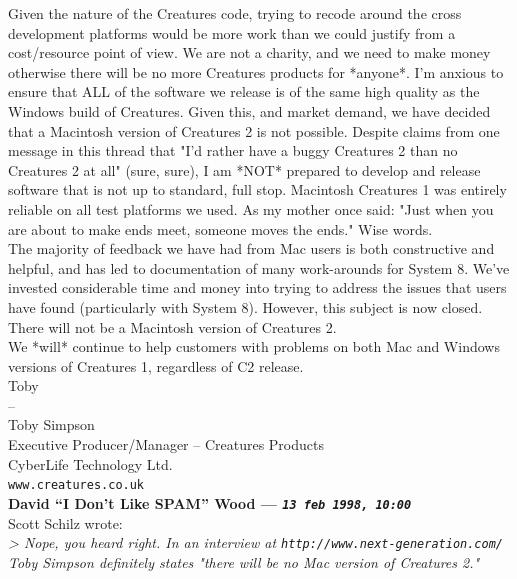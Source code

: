 \documentclass[11pt,twoside,a4paper]{article}
\begin{document}
\begin{multicols*}{2}
Given the nature of the Creatures code, trying to recode around the cross development platforms would be more work than we could justify from a cost/resource point of view. We are not a charity, and we need to make money otherwise there will be no more Creatures products for *anyone*. I'm anxious to ensure that ALL of the software we release is of the same high quality as the Windows build of Creatures. Given this, and market demand, we have decided that a Macintosh version of Creatures 2 is not possible. Despite claims from one message in this thread that "I'd rather have a buggy Creatures 2 than no Creatures 2 at all" (sure, sure), I am *NOT* prepared to develop and release software that is not up to standard, full stop. Macintosh Creatures 1 was entirely reliable on all test platforms we used. As my mother once said: "Just when you are about to make ends meet, someone moves the ends." Wise words. ~\\

The majority of feedback we have had from Mac users is both constructive and helpful, and has led to documentation of many work-arounds for System 8. We've invested considerable time and money into trying to address the issues that users have found (particularly with System 8). However, this subject is now closed. There will not be a Macintosh version of Creatures 2. ~\\

We *will* continue to help customers with problems on both Mac and Windows versions of Creatures 1, regardless of C2 release. ~\\

Toby ~\\
--  ~\\
Toby Simpson ~\\
Executive Producer/Manager -- Creatures Products ~\\
CyberLife Technology Ltd. ~\\
\texttt{www.creatures.co.uk} ~\\

 
		
	
		
\textbf{David ``I Don't Like SPAM'' Wood --- \emph{\texttt{13 feb 1998, 10:00}}}~\\

Scott Schilz wrote: ~\\
\emph{> Nope, you heard right. In an interview at \texttt{http://www.next-generation.com/} Toby Simpson definitely states "there will be no Mac version of Creatures 2."}~\\


\end{multicols*}
\end{document}

